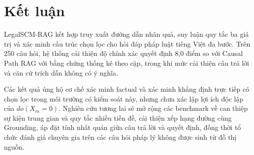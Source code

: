 \section{Kết luận}
\label{sec:conclusion}

LegalSCM-RAG kết hợp truy xuất đường dẫn nhân quả, suy luận quy tắc ba giá trị
và xác minh cấu trúc chọn lọc cho hỏi đáp pháp luật tiếng Việt đa bước. Trên 250
câu hỏi, hệ thống cải thiện độ chính xác quyết định 8,0 điểm so với Causal Path
RAG với bằng chứng thống kê theo cặp, trong khi mức cải thiện câu trả lời và căn
cứ trích dẫn không có ý nghĩa.

Các kết quả ủng hộ cơ chế xác minh factual và xác minh khẳng định trực tiếp có
chọn lọc trong môi trường có kiểm soát này, nhưng chưa xác lập lợi ích độc lập
của $do(X_m=0)$. Nghiên cứu tương lai sẽ mở rộng các benchmark về can thiệp sự
kiện trung gian và quy tắc nhiều tiền đề, cải thiện xếp hạng đường cùng
Grounding, áp đặt tính nhất quán giữa câu trả lời và quyết định, đồng thời tổ
chức đánh giá chuyên gia trên các câu hỏi pháp lý không được sinh từ đồ thị
nguồn.
